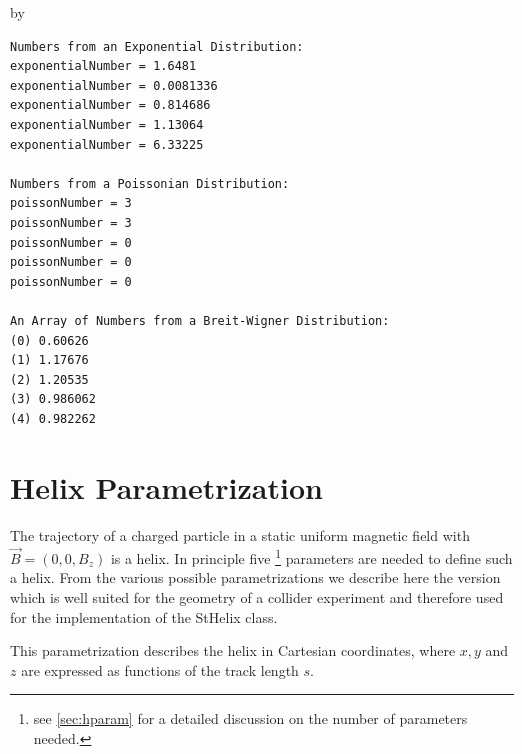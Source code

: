 \documentclass[twoside]{article}
\newcommand{\name}[1]{\textsf{#1}}%
\newcommand{\entrylabel}[1]{\mbox{\textbf{{#1}}}\hfil}%
\newenvironment{entry}
{\begin{list}{}%
    {\renewcommand{\makelabel}{\entrylabel}%
     \setlength{\labelwidth}{90pt}%
     \setlength{\leftmargin}{\labelwidth}
     \advance\leftmargin by \labelsep%
      }%
    }%
  {\end{list}}
\newcommand{\Entrylabel}[1]%
{\raisebox{0pt}[1ex][0pt]{\makebox[\labelwidth][l]%
    {\parbox[t]{\labelwidth}{\hspace{0pt}\textbf{{#1}}}}}}
\newenvironment{Entry}%
{\renewcommand{\entrylabel}{\Entrylabel}\begin{entry}}%
  {\end{entry}}
\begin{document}
\begin{description}
\begin{Entry}
{\begin{verbatim}
Numbers from an Exponential Distribution:
exponentialNumber = 1.6481
exponentialNumber = 0.0081336
exponentialNumber = 0.814686
exponentialNumber = 1.13064
exponentialNumber = 6.33225

Numbers from a Poissonian Distribution:
poissonNumber = 3
poissonNumber = 3
poissonNumber = 0
poissonNumber = 0
poissonNumber = 0

An Array of Numbers from a Breit-Wigner Distribution:
(0) 0.60626
(1) 1.17676
(2) 1.20535
(3) 0.986062
(4) 0.982262
\end{verbatim}
} %

\end{Entry}
\clearpage

%
%

\appendix
\section{Helix Parametrization}
\label{app:helix}  
The trajectory of a charged particle in a static uniform magnetic
field with $\vec{B} = (0, 0, B_z)$ is a helix. In principle five
\footnote{see \ref{sec:hparam} for a detailed discussion on the number of parameters needed.}
parameters are needed to define such a helix. From the various
possible parametrizations we describe here the version which is well
suited for the geometry of a collider experiment and therefore used
for the implementation of the \name{StHelix} class. 

This parametrization describes the helix in Cartesian coordinates,
where $x, y$ and $z$ are expressed as functions of the track length
$s$.


\end{description}
\end{document}
